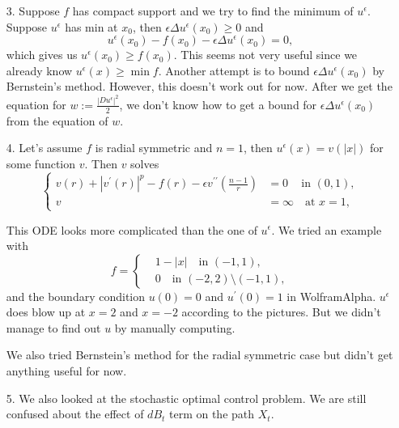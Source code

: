 \documentclass[english,reqno]{amsart}
\begin{document}
\begin{itemize}
\bigbreak
\bigbreak

\item[3.]Suppose $f$ has compact support and we try to find the minimum of $u^\epsilon$. Suppose $u^\epsilon$ has min at $x_0$, then $\epsilon \Delta u^\epsilon(x_0) \geq 0$ and $$u^\epsilon(x_0) -f(x_0) - \epsilon \Delta u^\epsilon(x_0) =0 ,$$
which gives us $u^\epsilon(x_0) \geq f(x_0)$. This seems not very useful since we already know $u^\epsilon (x) \geq \min f$. Another attempt is to bound $\epsilon \Delta u^\epsilon(x_0)$ by Bernstein's method. However, this doesn't work out for now. After we get the equation for $\displaystyle w :=\frac{|Du^\epsilon|^2}{2}$, we don't know how to get a bound for $\epsilon \Delta u^\epsilon(x_0)$ from the equation of $\displaystyle w$.

\bigbreak
\bigbreak

    \item[4.] 
Let's assume $f$ is radial symmetric and $n=1$, then $u^\epsilon(x) = v(|x|)$ for some function $v$. Then $v$ solves
\begin{equation}
\left\{
  \begin{aligned}
    v(r) + |v^\prime (r)|^p -f(r) - \epsilon v^{\prime \prime} \left(\frac{n-1}{r}\right) &=0 \quad \, \text{in } (0,1), \\
            v &= \infty \quad \text{at  } x=1,
  \end{aligned}
\right.
\end{equation}

This ODE looks more complicated than the one of $u^\epsilon$.
We tried an example with 
\begin{equation}
f=
\left\{
  \begin{aligned}
     &1-|x| \quad \text{in } (-1,1), \\
          & 0 \quad \text{in  } (-2,2) \setminus (-1, 1),
  \end{aligned}
\right.
\end{equation}
and the boundary condition $u(0)=0$ and $u^\prime(0)=1$ in WolframAlpha. $u^\epsilon$ does blow up at $x=2$ and $x=-2$ according to the pictures. But we didn't manage to find out $u$ by manually computing. 

We also tried Bernstein's method for the radial symmetric case but didn't get anything useful for now. 

\item[5.] We also looked at the stochastic optimal control problem. We are still confused about the effect of $dB_t$ term on the path $X_t$.

\end{itemize}
\end{document}
